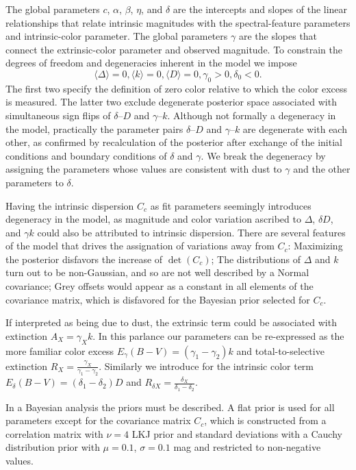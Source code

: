 \documentclass{aastex}   	%
\begin{document}
The global parameters $c$, $\alpha$, $\beta$, $\eta$, and $\delta$  are the intercepts and slopes of the linear relationships that
relate intrinsic magnitudes with the spectral-feature parameters and intrinsic-color parameter.  The global parameters $\gamma$ are the slopes that connect the extrinsic-color
parameter and observed magnitude.  To constrain the degrees of freedom and degeneracies inherent in the model we impose
\begin{equation}
\langle \Delta \rangle=0, \langle k \rangle=0, \langle D \rangle=0, \gamma_0 > 0, \delta_0 < 0.
\end{equation}
The first two specify the definition of zero color relative to which the color excess is measured.    The latter two exclude degenerate posterior space
associated
with  simultaneous sign flips of
$\delta$--$D$ and $\gamma$--$k$.
Although not formally a degeneracy in the model, practically the parameter pairs  $\delta$--$D$ and $\gamma$--$k$ are degenerate with
each other,
as confirmed by recalculation of the posterior after exchange of the initial conditions and boundary conditions of $\delta$ and $\gamma$.
We break the degeneracy
by assigning the parameters whose values are consistent with dust to $\gamma$ and the other parameters to $\delta$.


Having the intrinsic dispersion $C_c$ as fit parameters seemingly introduces degeneracy in the model, as magnitude and color variation
ascribed to $\Delta$, $\delta D$, and $\gamma k$ could also be attributed to intrinsic dispersion.  There are several features of the model
that drives the assignation of variations away from $C_c$:  Maximizing the posterior disfavors the increase of $\det{(C_c)}$;
The distributions of $\Delta$ and $k$ turn out to
be non-Gaussian, and so are not well described by a Normal covariance; Grey offsets would appear as a constant
in all elements of the covariance matrix, which is disfavored for the Bayesian prior selected for $C_c$.

If interpreted as being due to dust, the extrinsic term could be associated with extinction $A_X = \gamma_X k$.  In
this parlance our parameters can be re-expressed as the more familiar color excess
$E_\gamma(B-V) = (\gamma_1-\gamma_2) k$ and total-to-selective extinction $R_X = \frac{\gamma_X}{\gamma_1-\gamma_2}$.
Similarly we introduce for the intrinsic color term $E_\delta(B-V) = (\delta_1-\delta_2) D$ and $R_{\delta X} = \frac{\delta_X}{\delta_1-\delta_2}$.

In a Bayesian analysis the priors must be described.  A flat prior is used for all parameters except
for the covariance matrix $C_c$, which is constructed from a correlation matrix with  $\nu=4$  LKJ prior
\citep{Lewandowski20091989} and standard
deviations with a  Cauchy distribution prior with
 $\mu=0.1$, $\sigma=0.1$ mag and restricted to non-negative values.
\end{document}
